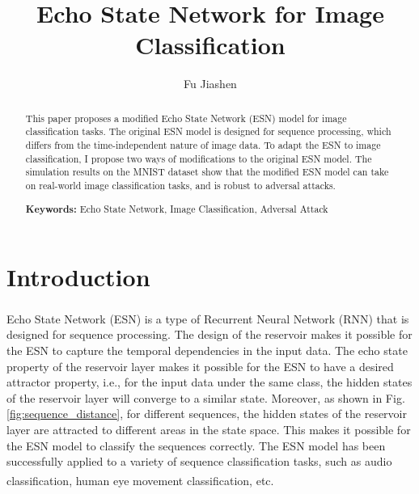 \documentclass{article}
\title{Echo State Network for Image Classification}
\author{Fu Jiashen}
\newcommand{\upcite}[1]{\textsuperscript{\cite{#1}}} %
\begin{document}
\maketitle

\begin{abstract}
    This paper proposes a modified Echo State Network (ESN) model for image classification tasks. 
    The original ESN model is designed for sequence processing, which differs from the time-independent nature of image data. 
    To adapt the ESN to image classification, I propose two ways of modifications to the original ESN model.
    The simulation results on the MNIST dataset show that the modified ESN model can take on real-world image classification tasks,
    and is robust to adversal attacks.

    \textbf{Keywords:} Echo State Network, Image Classification, Adversal Attack

\end{abstract}

\section{Introduction}

Echo State Network\upcite{ESN} (ESN) is a type of Recurrent Neural Network (RNN) 
that is designed for sequence processing. The design of the reservoir makes it possible for the ESN
to capture the temporal dependencies in the input data. The echo state property of the reservoir layer 
makes it possible for the ESN to have a desired attractor property, i.e., for the input data under the 
same class, the hidden states of the reservoir layer will converge to a similar state. Moreover, as shown in Fig. \ref{fig:sequence_distance}, for different sequences, the hidden states of the reservoir layer
are attracted to different areas in the state space. This makes it possible for the ESN model 
to classify the sequences correctly. The ESN model has been successfully applied to a variety of sequence classification tasks, 
such as audio classification\upcite{ESN_audio}, 
human eye movement classification\upcite{ESN_human_eye}, etc.
\end{document}
